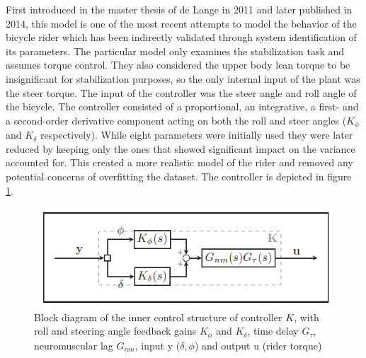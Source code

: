 First introduced in the master thesis of de Lange in 2011 and later published in 2014, this model is one of the most recent attempts to model the behavior of the bicycle rider which has been indirectly validated through system identification of its parameters. The particular model only examines the stabilization task and assumes  torque control. They also considered the upper body lean torque to be insignificant for stabilization purposes, so the only internal input of the plant was the steer torque. The input of the controller was the steer angle and roll angle of the bicycle. The controller consisted of a proportional, an integrative, a first- and a second-order derivative component acting on both the roll and steer angles (\ensuremath{K_\phi} and \ensuremath{K_\delta} respectively). While eight parameters were initially used they were later reduced by keeping only the ones that showed significant impact on the variance accounted for. This created a more realistic model of the rider and removed any potential concerns of overfitting the dataset. The controller is depicted in figure \ref{fig:figure9}.

\begin{figure}[ht]
    \centering
    \includegraphics[scale=0.55]{images/deLange_block.png}
    \caption{Block diagram of the inner control structure of controller \ensuremath{K}, with roll and steering angle feedback gains \ensuremath{K_\phi} and \ensuremath{K_\delta}, time delay \ensuremath{G_\tau}, neuromuscular lag \ensuremath{G_{nm}}, input y (\ensuremath{\delta,\phi}) and output u (rider torque)\cite{schwab2013} }
    \label{fig:figure9}
\end{figure}

